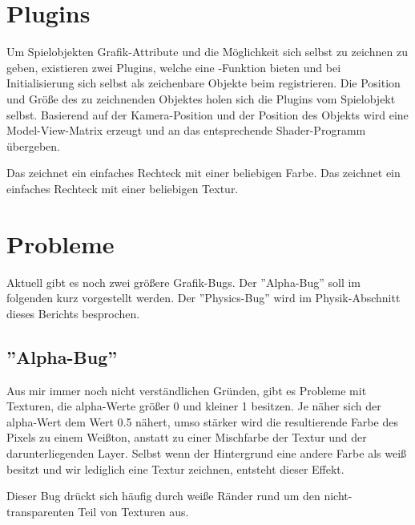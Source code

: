 \section{Plugins}

Um Spielobjekten Grafik-Attribute und die Möglichkeit sich selbst zu zeichnen zu geben, existieren zwei Plugins, welche eine -Funktion bieten und bei Initialisierung sich selbst als zeichenbare Objekte beim  registrieren. Die Position und Größe des zu zeichnenden Objektes holen sich die Plugins vom Spielobjekt selbst. Basierend auf der Kamera-Position und der Position des Objekts wird eine Model-View-Matrix erzeugt und an das entsprechende Shader-Programm übergeben.

Das  zeichnet ein einfaches Rechteck mit einer beliebigen Farbe. Das  zeichnet ein einfaches Rechteck mit einer beliebigen Textur.

\section{Probleme}

Aktuell gibt es noch zwei größere Grafik-Bugs. Der ''Alpha-Bug'' soll im folgenden kurz vorgestellt werden. Der ''Physics-Bug'' wird im Physik-Abschnitt dieses Berichts besprochen.

\subsection{''Alpha-Bug''}

Aus mir immer noch nicht verständlichen Gründen, gibt es Probleme mit Texturen, die alpha-Werte größer 0 und kleiner 1 besitzen. Je näher sich der alpha-Wert dem Wert 0.5 nähert, umso stärker wird die resultierende Farbe des Pixels zu einem Weißton, anstatt zu einer Mischfarbe der Textur und der darunterliegenden Layer. Selbst wenn der Hintergrund eine andere Farbe als weiß besitzt und wir lediglich eine Textur zeichnen, entsteht dieser Effekt.


Dieser Bug drückt sich häufig durch weiße Ränder rund um den nicht-transparenten Teil von Texturen aus.